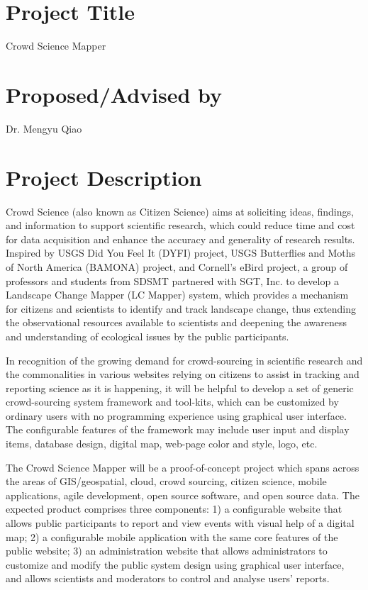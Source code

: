 
\section{Project Title} 
Crowd Science Mapper         

\section{Proposed/Advised by}   
Dr. Mengyu Qiao        
	
\section{Project Description}

Crowd Science (also known as Citizen Science) aims at soliciting ideas, findings, and information to support scientific research, which could reduce time and cost for data acquisition and enhance the accuracy and generality of research results.  Inspired by USGS Did You Feel It (DYFI) project, USGS Butterflies and Moths of North America (BAMONA) project, and Cornell’s eBird project, a group of professors and students from SDSMT partnered with SGT, Inc. to develop a Landscape Change Mapper (LC Mapper) system, which provides a mechanism for citizens and scientists to identify and track landscape change, thus extending the observational resources available to scientists and deepening the awareness and understanding of ecological issues by the public participants.

In recognition of the growing demand for crowd-sourcing in scientific research and the commonalities in various websites relying on citizens to assist in tracking and reporting science as it is happening, it will be helpful to develop a set of generic crowd-sourcing system framework and tool-kits, which can be customized by ordinary users with no programming experience using graphical user interface. The configurable features of the framework may include user input and display items, database design, digital map, web-page color and style, logo, etc. 

The Crowd Science Mapper will be a proof-of-concept project which spans across the areas of GIS/geospatial, cloud, crowd sourcing, citizen science, mobile applications, agile development, open source software, and open source data. The expected product comprises three components: 1) a configurable website that allows public participants to report and view events with visual help of a digital map; 2) a configurable mobile application with the same core features of the public website; 3) an administration website that allows administrators to customize and modify the public system design using graphical user interface, and allows scientists and moderators to control and analyse users’ reports.

